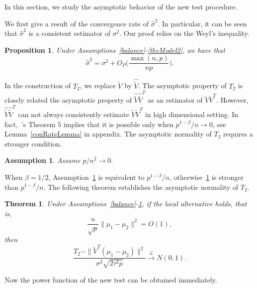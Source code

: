 \documentclass[review]{elsarticle}
\theoremstyle{plain}
\newtheorem{theorem}{\quad\quad Theorem}
\newtheorem{proposition}{\quad\quad Proposition}
\newtheorem{assumption}{\quad\quad Assumption}
\theoremstyle{definition}
\newtheorem{remark}{\quad\quad Remark}
\theoremstyle{remark}
\begin{document}
In this section, we study the asymptotic behavior of the new test procedure.


 We first give a result of the convergence rate of $\hat{\sigma}^2$.
 In particular, it can be seen that $\hat{\sigma}^2$ is a consistent estimator of $\sigma^2$.   
 Our proof relies on the Weyl's inequality.
\begin{proposition}\label{varianceEstimation}
    Under Assumptions~\ref{balance}-\ref{theModel2}, we have that%
    $$
    \hat{\sigma}^2=\sigma^2 + O_P\Big(\frac{\max (n,p)}{np}\Big).
    $$
\end{proposition}

In the construction of $T_2$, we replace $\tilde{V}$ by $\hat{\tilde{V}}$.
The asymptotic property of $T_2$ is closely related the asymptotic property of $\hat{\tilde{V}}\hat{\tilde{V}}^T$ as an estimator of $\tilde{V}\tilde{V}^T$.
However, $\hat{\tilde{V}}\hat{\tilde{V}}^T$ can not always consistently estimate $\tilde{V}\tilde{V}^T$ in high dimensional setting.
In fact,~\cite{Tony2013}'s Theorem $5$ implies that it is possible only when $p^{1-\beta}/n\to 0$, see Lemma~\ref{conRateLemma} in appendix.
The asymptotic normality of $T_2$ requires a stronger condition.
\begin{assumption}\label{pAndN}
    Assume
    $
    {p}/{n^2}\to 0.
    $
\end{assumption}
When $\beta=1/2$, Assumption~\ref{pAndN} is equivalent to $p^{1-\beta}/n$, otherwise~\ref{pAndN} is stronger than $p^{1-\beta}/n$.
The following theorem establishes the asymptotic normality of $T_2$.
\begin{theorem}\label{myPanpan}
    Under Assumptions~\ref{balance}-\ref{pAndN},
if the local alternative holds, that is,
    $$\frac{n}{\sqrt{p}}\|\mu_1-\mu_2\|^2=O(1),$$
then 
\begin{equation*}
        \frac{T_2-\|\tilde{V}^T(\mu_1-\mu_2)\|^2}{\sigma^2\sqrt{2\tau^2 p}}\xrightarrow{\mathcal{L}}N(0,1).
\end{equation*}
\end{theorem} 
Now the power function of the new test can be obtained immediately.
\end{document}

